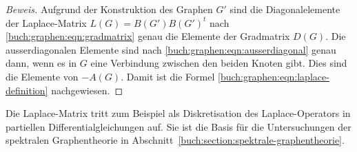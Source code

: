\begin{proof}[Beweis]
Aufgrund der Konstruktion des Graphen $G'$ sind die Diagonalelemente
der Laplace-Matrix
$L(G)=B(G')B(G')^t$ nach \eqref{buch:graphen:eqn:gradmatrix} genau
die Elemente der Gradmatrix $D(G)$.
Die ausserdiagonalen Elemente sind nach
\eqref{buch:graphen:eqn:ausserdiagonal}
genau dann, wenn es in $G$ eine Verbindung zwischen den beiden Knoten
gibt.
Dies sind die Elemente von $-A(G)$.
Damit ist die Formel
\eqref{buch:graphen:eqn:laplace-definition}
nachgewiesen.
\end{proof}

Die Laplace-Matrix tritt zum Beispiel als Diskretisation des Laplace-Operators
in partiellen Differentialgleichungen auf.
Sie ist die Basis für die Untersuchungen der spektralen Graphentheorie
in Abschnitt~\ref{buch:section:spektrale-graphentheorie}.

